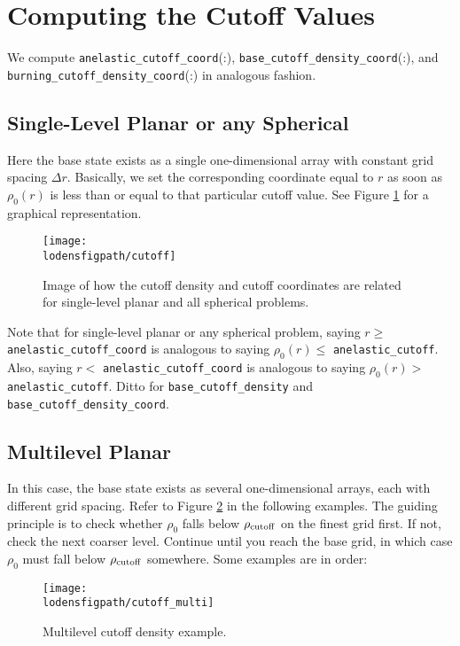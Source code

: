 \section{Computing the Cutoff Values}
We compute {\tt anelastic\_cutoff\_coord}(:), {\tt base\_cutoff\_density\_coord}(:), 
and {\tt burning\_cutoff\_density\_coord}(:) in analogous fashion.

\subsection{Single-Level Planar or any Spherical}
Here the base state exists as a single one-dimensional array with constant grid
spacing $\Delta r$.  Basically, we set the corresponding coordinate equal to $r$ as soon 
as $\rho_0(r)$ is less than  or equal to that particular cutoff value.
See Figure \ref{Fig:Cutoff} for a graphical representation.
\begin{figure}[hpb]
\centering
\texttt{[image: \\lodensfigpath/cutoff]}\hspace{0.2in}
\caption{Image of how the cutoff density and cutoff coordinates
are related for single-level planar and all spherical problems.}
\label{Fig:Cutoff}
\end{figure}

Note that for single-level planar or any spherical problem, saying $r\ge$ {\tt anelastic\_cutoff\_coord} is analogous to saying $\rho_0(r)\le$ {\tt anelastic\_cutoff}.  Also, saying $r<$ {\tt anelastic\_cutoff\_coord} is analogous to saying $\rho_0(r)>$ {\tt anelastic\_cutoff}.  Ditto for {\tt base\_cutoff\_density} and {\tt base\_cutoff\_density\_coord}.

\subsection{Multilevel Planar}
In this case, the base state exists as several one-dimensional arrays, each with
different grid spacing.  Refer to Figure \ref{Fig:Cutoff_Multi} in the following examples.
The guiding principle is to check whether $\rho_0$ falls below $\rho_{\rm cutoff}$ on the finest
grid first.  If not, check the next coarser level.  Continue until you reach the base grid,
in which case $\rho_0$ must fall below $\rho_{\rm cutoff}$ somewhere.  Some examples are in order:
\begin{figure}[hpb]
\centering
\texttt{[image: \\lodensfigpath/cutoff\_multi]}\hspace{0.2in}
\caption{Multilevel cutoff density example.}
\label{Fig:Cutoff_Multi}
\end{figure}

